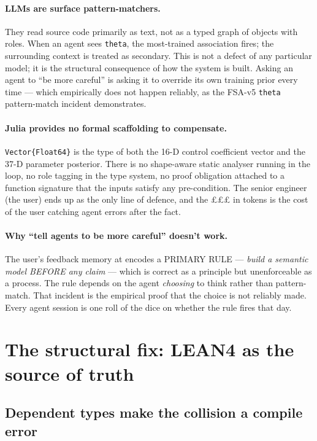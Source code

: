 \documentclass[11pt,a4paper]{article}
\begin{document}
\paragraph{LLMs are surface pattern-matchers.} They read source
code primarily as text, not as a typed graph of objects with
roles. When an agent sees \texttt{theta}, the most-trained
association fires; the surrounding context is treated as
secondary. This is not a defect of any particular model; it is the
structural consequence of how the system is built. Asking an agent
to ``be more careful'' is asking it to override its own training
prior every time --- which empirically does not happen reliably,
as the FSA-v5 \texttt{theta} pattern-match incident demonstrates.

\paragraph{Julia provides no formal scaffolding to compensate.}
\texttt{Vector\{Float64\}} is the type of both the 16-D control
coefficient vector and the 37-D parameter posterior. There is no
shape-aware static analyser running in the loop, no role tagging
in the type system, no proof obligation attached to a function
signature that the inputs satisfy any pre-condition. The senior
engineer (the user) ends up as the only line of defence, and the
£££ in tokens is the cost of the user catching agent errors after
the fact.

\paragraph{Why ``tell agents to be more careful'' doesn't work.}
The user's feedback memory at 
encodes a PRIMARY RULE --- \emph{build a semantic model BEFORE any
claim} --- which is correct as a principle but unenforceable as a
process. The rule depends on the agent \emph{choosing} to think
rather than pattern-match. That incident is the empirical proof
that the choice is not reliably made. Every agent session is one
roll of the dice on whether the rule fires that day.

\section{The structural fix: LEAN4 as the source of truth}
\label{sec:fix}

\subsection{Dependent types make the collision a compile error}
\end{document}

